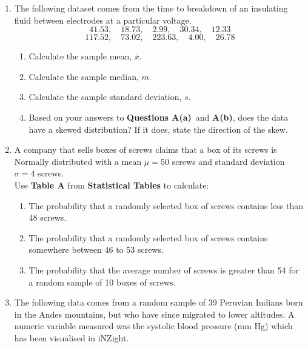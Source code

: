 \documentclass[twoside, 12pt, a4paper]{article}\usepackage[]{graphicx}\usepackage[usenames,dvipsnames]{xcolor}
\begin{document}
\begin{enumerate}[label=\Alph*.]
  \item The following dataset comes from the time to breakdown of an insulating fluid between electrodes at a particular voltage. \vspace{-6pt}
  \begin{equation*}
    41.53, \quad 18.73, \quad 2.99, \quad 30.34, \quad 12.33
  \end{equation*} \vspace{-18pt}
  \begin{equation*}
    117.52, \quad 73.02, \quad 223.63, \quad 4.00, \quad 26.78
  \end{equation*}
  \begin{enumerate}
    \item Calculate the sample mean, $\bar{x}$.
    \item Calculate the sample median, $m$.
    \item Calculate the sample standard deviation, $s$.
    \item Based on your answers to \textbf{Questions A(a)}\ and \textbf{A(b)}, does the data have a skewed distribution? If it does, state the direction of the skew.
  \end{enumerate}
  
  \item A company that sells boxes of screws claims that a box of its screws is Normally distributed with a mean $\mu = 50$ screws and standard deviation $\sigma = 4$ screws. \medskip \\ Use \textbf{Table A} from \textbf{Statistical Tables} to calculate:
  \begin{enumerate}
    \item The probability that a randomly selected box of screws contains less than 48 screws.
    \item The probability that a randomly selected box of screws contains somewhere between 46 to 53 screws.
    \item The probability that the average number of screws is greater than 54 for a random sample of 10 boxes of screws.
  \end{enumerate}
  
  \clearpage
  
  \item The following data comes from a random sample of 39 Peruvian Indians born in the Andes mountains, but who have since migrated to lower altitudes. A numeric variable measured was the systolic blood pressure (mm Hg) which has been visualised in \textsf{iNZight}.
  



\end{enumerate}
\end{document}
